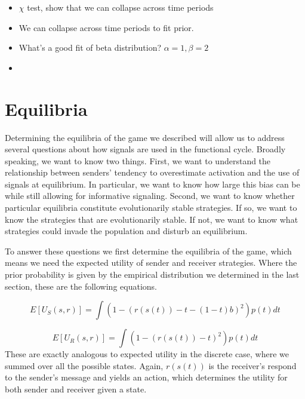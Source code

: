 \documentclass[12pt]{upenndiss}
\theoremstyle{definition} \newtheorem{definition}{Definition}
\begin{document}
\begin{itemize}
	\item $\chi$ test, show that we can collapse across time periods
	\item We can collapse across time periods to fit prior.
	\item What's a good fit of beta distribution? $\alpha = 1, \beta = 2$
	\item 
\end{itemize}

\section{Equilibria}

Determining the equilibria of the game we described will allow us to address several questions about how signals are used in the functional cycle. Broadly speaking, we want to know two things. First, we want to understand the relationship between senders' tendency to overestimate activation and the use of signals at equilibrium. In particular, we want to know how large this bias can be while still allowing for informative signaling. Second, we want to know whether particular equilibria constitute evolutionarily stable strategies. If so, we want to know the strategies that are evolutionarily stable. If not, we want to know what strategies could invade the population and disturb an equilibrium.

To answer these questions we first determine the equilibria of the game, which means we need the expected utility of sender and receiver strategies. Where the prior probability is given by the empirical distribution we determined in the last section, these are the following equations.

\begin{equation}
     E[U_S(s, r)] = \int \left( 1 -(r(s(t)) - t - (1-t)b)^2 \right)p(t)dt
\end{equation}

\begin{equation}
      E[U_R(s, r)] = \int \left( 1 -(r(s(t)) - t)^2 \right) p(t) dt
\end{equation}
These are exactly analogous to expected utility in the discrete case, where we summed over all the possible states. Again, $r(s(t))$ is the receiver's respond to the sender's message and yields an action, which determines the utility for both sender and receiver given a state.
\end{document}

